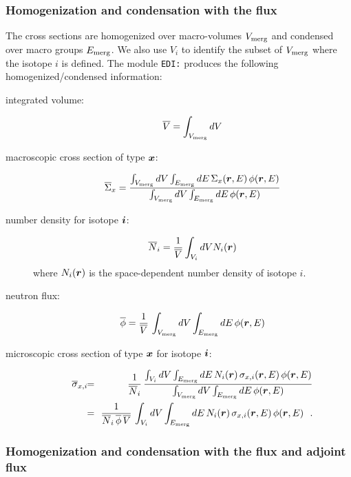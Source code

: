 \subsubsection{Homogenization and condensation with the flux}

The cross sections are homogenized over macro-volumes $V_{\rm merg}$ and condensed over
macro groups $E_{\rm merg}$. We also use $V_i$ to identify the subset of $V_{\rm merg}$ where
the isotope $i$ is defined. The module {\tt EDI:} produces the following homogenized/condensed information:

\begin{description}
\item[integrated volume:]
$$
\overline V=\int_{V_{\rm merg}} dV
$$

\item[macroscopic cross section of type $\bff(x)$:]
$$
\overline \Sigma_x = {\int_{V_{\rm merg}} dV \int_{E_{\rm merg}} dE \, \Sigma_x(\bff(r),E) \, \phi(\bff(r),E)
\over \int_{V_{\rm merg}} dV \int_{E_{\rm merg}} dE \, \phi(\bff(r),E)}
$$

\item[number density for isotope $\bff(i)$:]
$$
\overline N_i= {1\over \overline V} \int_{V_i} dV N_i(\bff(r))
$$
\noindent where $N_i(\bff(r))$ is the space-dependent number density of isotope $i$.

\item[neutron flux:]
$$
\overline\phi = {1\over \overline V} \, \int_{V_{\rm merg}} dV \int_{E_{\rm merg}} dE \, \phi(\bff(r),E)
$$

\item[microscopic cross section of type $\bff(x)$ for isotope $\bff(i)$:]
\begin{eqnarray*}
\overline \sigma_{x,i} \negthinspace\negthinspace &=& \negthinspace\negthinspace { 1 \over \overline N_i} \, {\int_{V_i} dV \int_{E_{\rm merg}} dE \, N_i(\bff(r)) \, \sigma_{x,i}(\bff(r),E) \, \phi(\bff(r),E)
\over \int_{V_{\rm merg}} dV \int_{E_{\rm merg}} dE \, \phi(\bff(r),E)} \\
&=& \negthinspace\negthinspace { 1 \over \overline N_i\, \overline\phi \, \overline V} \, \int_{V_i} dV \int_{E_{\rm merg}} dE \, N_i(\bff(r)) \, \sigma_{x,i}(\bff(r),E) \, \phi(\bff(r),E) \ \ .
\end{eqnarray*}
\end{description}

\subsubsection{Homogenization and condensation with the flux and adjoint flux}\label{sect:prod}


